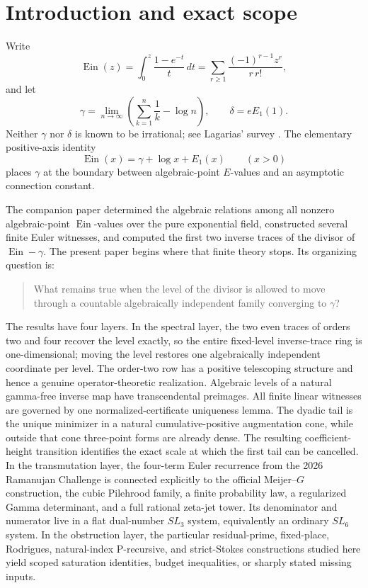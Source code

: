 \documentclass[11pt]{article}
\theoremstyle{definition}
\theoremstyle{remark}
\newcommand{\Ein}{\operatorname{Ein}}
\begin{document}
\tableofcontents

\section{Introduction and exact scope}

Write
\[
 \Ein(z)=\int_0^z\frac{1-e^{-t}}t\,dt
 =\sum_{r\ge1}\frac{(-1)^{r-1}z^r}{r\,r!},
\]
and let
\[
 \gamma=\lim_{n\to\infty}\left(\sum_{k=1}^n\frac1k-\log n\right),
 \qquad
 \delta=eE_1(1).
\]
Neither \(\gamma\) nor \(\delta\) is known to be irrational; see
Lagarias' survey \cite{Lagarias2013}.  The elementary positive-axis identity
\begin{equation}\label{eq:Ein-connection}
 \Ein(x)=\gamma+\log x+E_1(x)\qquad(x>0)
\end{equation}
places \(\gamma\) at the boundary between algebraic-point \(E\)-values and an
asymptotic connection constant.

The companion paper \cite{KEIO2026I} determined the algebraic relations among
all nonzero algebraic-point \(\Ein\)-values over the pure exponential field,
constructed several finite Euler witnesses, and computed the first two
inverse traces of the divisor of \(\Ein-\gamma\).  The present paper begins
where that finite theory stops.  Its organizing question is:
\begin{quote}
What remains true when the level of the divisor is allowed to move through a
countable algebraically independent family converging to \(\gamma\)?
\end{quote}

The results have four layers.  In the spectral layer, the two even traces
of orders two and four
recover the level exactly, so the entire fixed-level inverse-trace ring is
one-dimensional; moving the level restores one algebraically
independent coordinate per level.  The order-two row has a positive
telescoping structure and hence a genuine operator-theoretic realization.
Algebraic levels of a natural gamma-free inverse map have
transcendental preimages.  All finite linear witnesses are governed by
one normalized-certificate uniqueness lemma.  The dyadic tail is the
unique minimizer in a natural cumulative-positive augmentation cone, while
outside that cone three-point forms are already dense.  The resulting
coefficient-height transition identifies the exact scale at which the first
tail can be cancelled.  In the transmutation layer, the four-term Euler
recurrence from the 2026 Ramanujan Challenge is connected explicitly to the
official Meijer--\(G\) construction, the cubic Pilehrood family, a finite
probability law, a regularized Gamma determinant, and a full rational
zeta-jet tower.  Its denominator and numerator live in a flat dual-number
\(SL_3\) system, equivalently an ordinary \(SL_6\) system.  In the
obstruction layer, the particular residual-prime,
fixed-place, Rodrigues, natural-index P-recursive, and strict-Stokes
constructions studied here yield scoped saturation identities, budget
inequalities, or sharply stated missing inputs.
\end{document}
